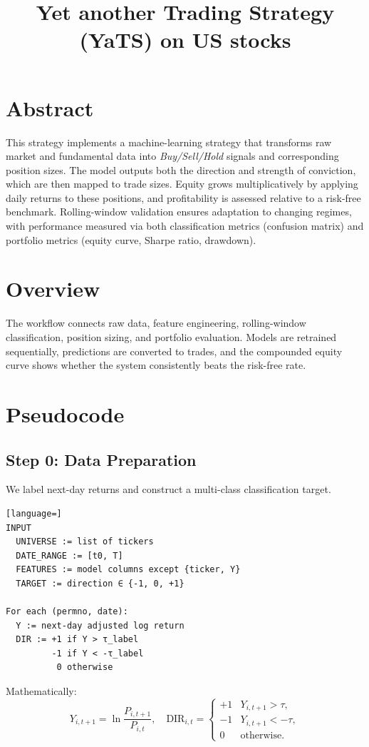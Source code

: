 \documentclass[11pt]{article}
\title{Yet another Trading Strategy (YaTS) on US stocks}
\date{}
\begin{document}
    \maketitle

    \section*{Abstract}
    This strategy implements a machine-learning strategy that transforms raw market and fundamental data into \emph{Buy/Sell/Hold} signals and corresponding position sizes.
    The model outputs both the direction and strength of conviction, which are then mapped to trade sizes.
    Equity grows multiplicatively by applying daily returns to these positions, and profitability is assessed relative to a risk-free benchmark.
    Rolling-window validation ensures adaptation to changing regimes, with performance measured via both classification metrics (confusion matrix) and portfolio metrics (equity curve, Sharpe ratio, drawdown).

    \section*{Overview}
    The workflow connects raw data, feature engineering, rolling-window classification, position sizing, and portfolio evaluation.
    Models are retrained sequentially, predictions are converted to trades, and the compounded equity curve shows whether the system consistently beats the risk-free rate.

    \section*{Pseudocode}

    \subsection*{Step 0: Data Preparation}
    We label next-day returns and construct a multi-class classification target.
    \begin{lstlisting}[language=]
INPUT
  UNIVERSE := list of tickers
  DATE_RANGE := [t0, T]
  FEATURES := model columns except {ticker, Y}
  TARGET := direction ∈ {-1, 0, +1}

For each (permno, date):
  Y := next-day adjusted log return
  DIR := +1 if Y > τ_label
         -1 if Y < -τ_label
          0 otherwise
    \end{lstlisting}
    Mathematically:
    \[
      Y_{i,t+1} = \ln \frac{P_{i,t+1}}{P_{i,t}},
      \quad
      \text{DIR}_{i,t} =
      \begin{cases}
      +1 & Y_{i,t+1} > \tau, \\
      -1 & Y_{i,t+1} < -\tau, \\
      0 & \text{otherwise.}
      \end{cases}
    \]
\end{document}
